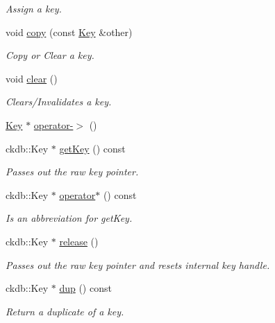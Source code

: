 \begin{DoxyCompactItemize}
\begin{DoxyCompactList}\small\item\em Assign a key. \end{DoxyCompactList}\item 
void \mbox{\hyperlink{classkdb_1_1Key_ab5bc93e22f4cf40b9d2b1fc32cc260be}{copy}} (const \mbox{\hyperlink{classkdb_1_1Key}{Key}} \&other)
\begin{DoxyCompactList}\small\item\em Copy or Clear a key. \end{DoxyCompactList}\item 
void \mbox{\hyperlink{classkdb_1_1Key_a33a112681b0b2e94e6d369c0f89e361b}{clear}} ()
\begin{DoxyCompactList}\small\item\em Clears/\+Invalidates a key. \end{DoxyCompactList}\item 
\mbox{\hyperlink{classkdb_1_1Key}{Key}} $\ast$ \mbox{\hyperlink{classkdb_1_1Key_ab64ec9d578e083dad3e43322535cf108}{operator-\/$>$}} ()
\item 
ckdb\+::\+Key $\ast$ \mbox{\hyperlink{classkdb_1_1Key_a6be9b3bb17434fd4362d137183d51100}{get\+Key}} () const
\begin{DoxyCompactList}\small\item\em Passes out the raw key pointer. \end{DoxyCompactList}\item 
ckdb\+::\+Key $\ast$ \mbox{\hyperlink{classkdb_1_1Key_a66e5af2387ebb86efa465ba2e844cafd}{operator$\ast$}} () const
\begin{DoxyCompactList}\small\item\em Is an abbreviation for get\+Key. \end{DoxyCompactList}\item 
ckdb\+::\+Key $\ast$ \mbox{\hyperlink{classkdb_1_1Key_a9ae719043e6e99f5f3d6fb85837306f8}{release}} ()
\begin{DoxyCompactList}\small\item\em Passes out the raw key pointer and resets internal key handle. \end{DoxyCompactList}\item 
ckdb\+::\+Key $\ast$ \mbox{\hyperlink{classkdb_1_1Key_ababb1ccd9f18db379eb4a62f8db87bf5}{dup}} () const
\begin{DoxyCompactList}\small\item\em Return a duplicate of a key. \end{DoxyCompactList}\item 

\end{DoxyCompactItemize}

